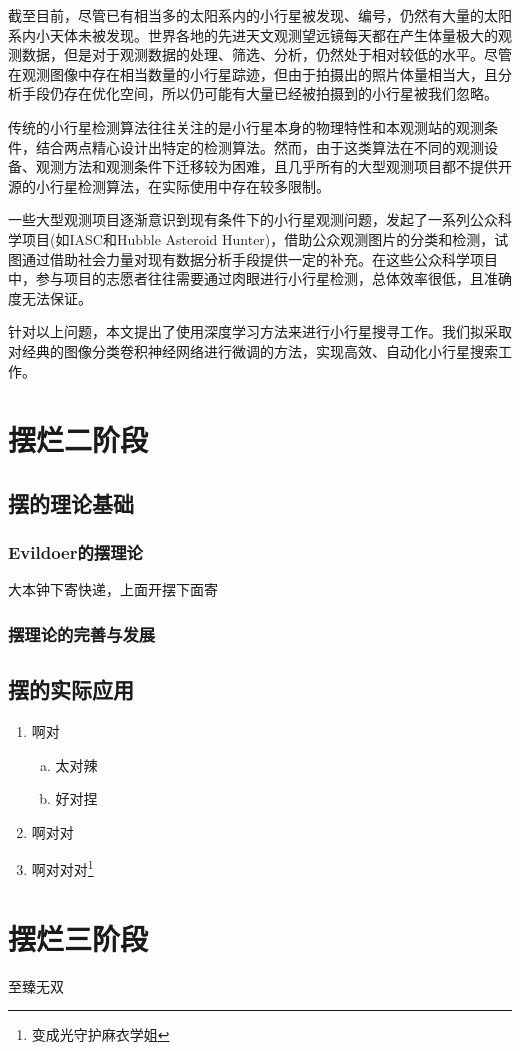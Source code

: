 \documentclass[12pt,a4paper]{article}%
\begin{document}
截至目前，尽管已有相当多的太阳系内的小行星被发现、编号，仍然有大量的太阳系内小天体未被发现。世界各地的先进天文观测望远镜每天都在产生体量极大的观测数据，但是对于观测数据的处理、筛选、分析，仍然处于相对较低的水平。尽管在观测图像中存在相当数量的小行星踪迹，但由于拍摄出的照片体量相当大，且分析手段仍存在优化空间，所以仍可能有大量已经被拍摄到的小行星被我们忽略。

传统的小行星检测算法往往关注的是小行星本身的物理特性和本观测站的观测条件，结合两点精心设计出特定的检测算法。然而，由于这类算法在不同的观测设备、观测方法和观测条件下迁移较为困难，且几乎所有的大型观测项目都不提供开源的小行星检测算法，在实际使用中存在较多限制。

一些大型观测项目逐渐意识到现有条件下的小行星观测问题，发起了一系列公众科学项目(如IASC和Hubble Asteroid Hunter)，借助公众观测图片的分类和检测，试图通过借助社会力量对现有数据分析手段提供一定的补充。在这些公众科学项目中，参与项目的志愿者往往需要通过肉眼进行小行星检测，总体效率很低，且准确度无法保证。

针对以上问题，本文提出了使用深度学习方法来进行小行星搜寻工作。我们拟采取对经典的图像分类卷积神经网络进行微调的方法，实现高效、自动化小行星搜索工作。

\section{}



\section{摆烂二阶段}
\subsection{摆的理论基础}
\subsubsection{Evildoer的摆理论}
大本钟下寄快递，上面开摆下面寄
\subsubsection{摆理论的完善与发展}
\subsection{摆的实际应用}
\begin{enumerate}[1.]%
    \item 啊对
          \begin{enumerate}[(a)]%
              \item 太对辣
              \item 好对捏
          \end{enumerate}
    \item 啊对对
    \item 啊对对对\footnote{变成光守护麻衣学姐}%
\end{enumerate}

\section{摆烂三阶段}
至臻无双 \cite{remillard_x-ray_2006}

\newpage



\end{document}
